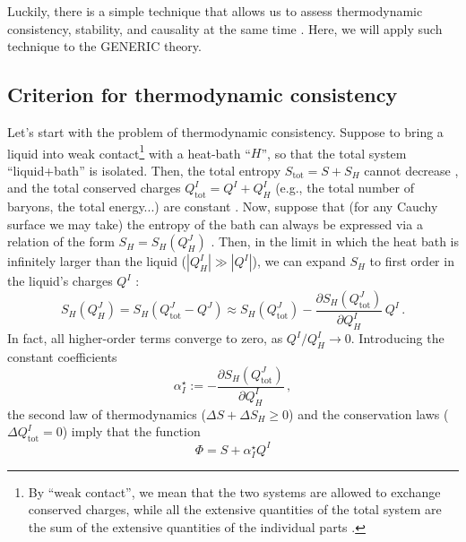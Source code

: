 \documentclass[a4paper, amsfonts, amssymb, amsmath, reprint, showkeys, nofootinbib, twoside, onecolumn, notitlepage]{revtex4-1}
\theoremstyle{definition}
\theoremstyle{theorem}
\begin{document}
Luckily, there is a simple technique that allows us to assess thermodynamic consistency, stability, and causality at the same time \cite{GavassinoCausality2021,GavassinoStabilityCarter2022}. Here, we will apply such technique to the GENERIC theory.


\subsection{Criterion for thermodynamic consistency}
\label{subthermoconst}

Let's start with the problem of thermodynamic consistency. Suppose to bring a liquid into weak contact\footnote{
     By ``weak contact'', we mean that the two systems are allowed to exchange conserved charges, while all the extensive quantities of the total system are the sum of the extensive quantities of the individual parts \cite{GavassinoTermometri}.} 
with a heat-bath ``$H$'', so that the total system ``liquid+bath'' is isolated. Then, the total entropy $S_{\text{tot}}=S+S_H$ cannot decrease \cite{Hishcock1983}, and the total conserved charges $Q_\text{tot}^I=Q^I+Q_H^I$ (e.g., the total number of baryons, the total energy...) are constant \cite{MTW_book,Weinberg_book_1972}. Now, suppose that (for any Cauchy surface we may take) the entropy of the bath can always be expressed via a relation of the form
$S_H=S_H(Q_H^J)$ \cite{GavassinoLorentzInvariance2022}. Then, in the limit in which the heat bath is infinitely larger than the liquid ($|Q^I_H|\gg |Q^I|$), we can expand $S_H$ to first order in the liquid's charges $Q^I$ \cite{huang_book,Termo,GavassinoTermometri}:
\begin{equation}
S_H(Q_H^J)= S_H(Q_\text{tot}^J-Q^J) \approx S_H(Q^J_{\text{tot}})- \dfrac{\partial S_H (Q^J_{\text{tot}})}{\partial Q^I_H} \, Q^I  \, . 
\end{equation}
In fact, all higher-order terms converge to zero, as $Q^I/Q_H^I \rightarrow 0$. Introducing the constant coefficients
\begin{equation}\label{alphastar}
\alpha^\star_I:= - \dfrac{\partial S_H (Q^J_{\text{tot}})}{\partial Q^I_H} \, ,
\end{equation}
the second law of thermodynamics ($\Delta S+\Delta S_H\geq 0$) and the conservation laws ($\Delta Q^I_{\text{tot}}=0$) imply that the function
\begin{equation}
\Phi = S + \alpha^\star_I Q^I 
\end{equation}
\end{document}
